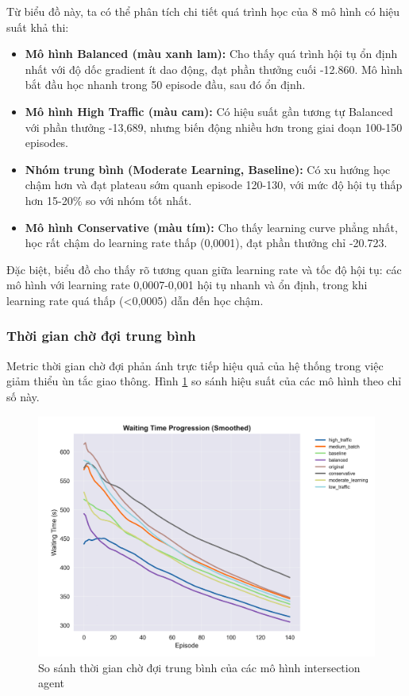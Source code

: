 Từ biểu đồ này, ta có thể phân tích chi tiết quá trình học của 8 mô hình có hiệu suất khả thi:

\begin{itemize}
    \item \textbf{Mô hình Balanced (màu xanh lam):} Cho thấy quá trình hội tụ ổn định nhất với độ dốc gradient ít dao động, đạt phần thưởng cuối -12.860. Mô hình bắt đầu học nhanh trong 50 episode đầu, sau đó ổn định.
    
    \item \textbf{Mô hình High Traffic (màu cam):} Có hiệu suất gần tương tự Balanced với phần thưởng -13,689, nhưng biến động nhiều hơn trong giai đoạn 100-150 episodes.
    
    \item \textbf{Nhóm trung bình (Moderate Learning, Baseline):} Có xu hướng học chậm hơn và đạt plateau sớm quanh episode 120-130, với mức độ hội tụ thấp hơn 15-20\% so với nhóm tốt nhất.
    
    \item \textbf{Mô hình Conservative (màu tím):} Cho thấy learning curve phẳng nhất, học rất chậm do learning rate thấp (0,0001), đạt phần thưởng chỉ -20.723.
\end{itemize}

Đặc biệt, biểu đồ cho thấy rõ tương quan giữa learning rate và tốc độ hội tụ: các mô hình với learning rate 0,0007-0,001 hội tụ nhanh và ổn định, trong khi learning rate quá thấp (<0,0005) dẫn đến học chậm.

\subsubsection{Thời gian chờ đợi trung bình}
Metric thời gian chờ đợi phản ánh trực tiếp hiệu quả của hệ thống trong việc giảm thiểu ùn tắc giao thông. Hình \ref{fig:intersection_filtered_waiting_time} so sánh hiệu suất của các mô hình theo chỉ số này.

\begin{figure}[!htp]
    \centering
    \includegraphics[width=\textwidth]{figures/individual_plots/intersection_filtered_waiting_time.png}
    \caption{So sánh thời gian chờ đợi trung bình của các mô hình intersection agent}
    \label{fig:intersection_filtered_waiting_time}
\end{figure}

